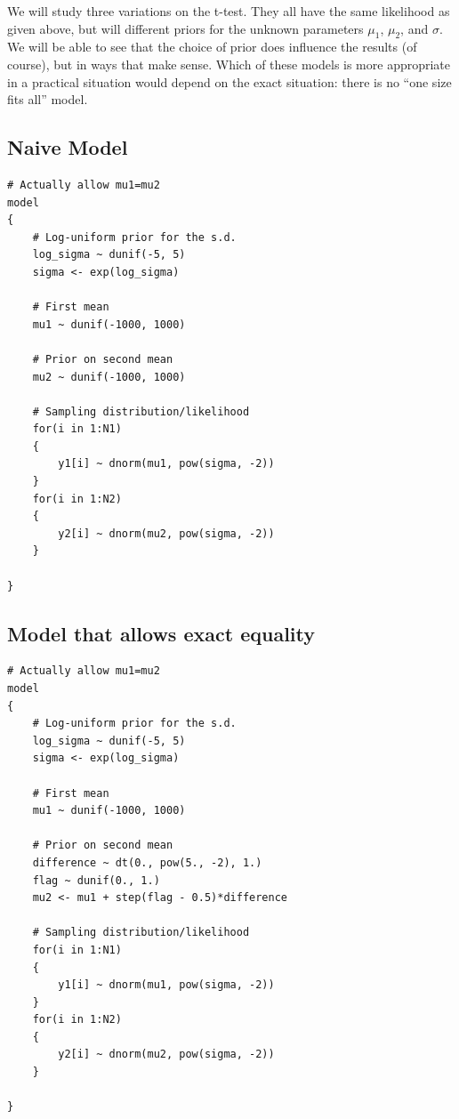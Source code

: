 We will study three variations on the t-test. They all have the same likelihood
as given above,
but will different priors for the unknown parameters $\mu_1$, $\mu_2$, and
$\sigma$.
We will be able to see that the choice of prior does
influence the results (of course), but in ways that make sense. Which of these
models is more appropriate in a practical situation would depend on the exact
situation: there is no ``one size fits all'' model.

\subsection{Naive Model}

\begin{framed}
\begin{verbatim}
# Actually allow mu1=mu2
model
{
    # Log-uniform prior for the s.d.
    log_sigma ~ dunif(-5, 5)
    sigma <- exp(log_sigma)

    # First mean
    mu1 ~ dunif(-1000, 1000)

    # Prior on second mean
    mu2 ~ dunif(-1000, 1000)

    # Sampling distribution/likelihood
    for(i in 1:N1)
    {
        y1[i] ~ dnorm(mu1, pow(sigma, -2))
    }
    for(i in 1:N2)
    {
        y2[i] ~ dnorm(mu2, pow(sigma, -2))
    }

}
\end{verbatim}
\end{framed}

\subsection{Model that allows exact equality}

\begin{framed}
\begin{verbatim}
# Actually allow mu1=mu2
model
{
    # Log-uniform prior for the s.d.
    log_sigma ~ dunif(-5, 5)
    sigma <- exp(log_sigma)

    # First mean
    mu1 ~ dunif(-1000, 1000)

    # Prior on second mean
    difference ~ dt(0., pow(5., -2), 1.)
    flag ~ dunif(0., 1.)
    mu2 <- mu1 + step(flag - 0.5)*difference

    # Sampling distribution/likelihood
    for(i in 1:N1)
    {
        y1[i] ~ dnorm(mu1, pow(sigma, -2))
    }
    for(i in 1:N2)
    {
        y2[i] ~ dnorm(mu2, pow(sigma, -2))
    }

}
\end{verbatim}
\end{framed}

